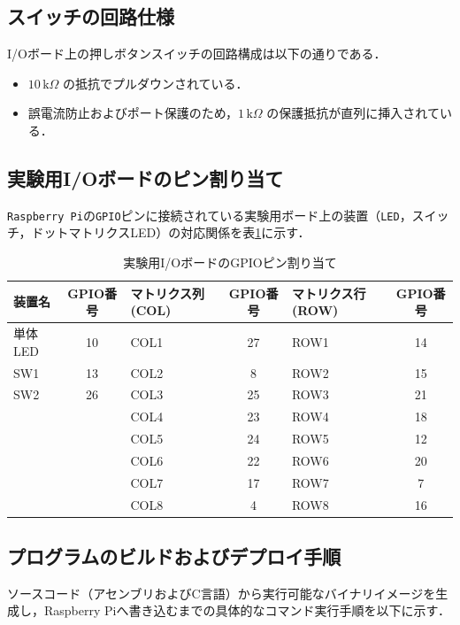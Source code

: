 \documentclass{jlreq}
\begin{document}
  \subsection{スイッチの回路仕様}
  I/Oボード上の押しボタンスイッチの回路構成は以下の通りである．
  \begin{itemize}
      \item $10\,\text{k}\Omega$ の抵抗でプルダウンされている．
      \item 誤電流防止およびポート保護のため，$1\,\text{k}\Omega$ の保護抵抗が直列に挿入されている．
  \end{itemize}

  \subsection{実験用I/Oボードのピン割り当て}
  \texttt{Raspberry Pi}の\texttt{GPIO}ピンに接続されている実験用ボード上の装置（\texttt{LED}，スイッチ，ドットマトリクスLED）の対応関係を表\ref{tab:pin_assign}に示す．

  \begin{table}[htbp]
      \centering
      \caption{実験用I/OボードのGPIOピン割り当て}
      \label{tab:pin_assign}
      \begin{tabular}{lc|lc|lc}
          \hline
          装置名 & GPIO番号 & マトリクス列(COL) & GPIO番号 & マトリクス行(ROW) & GPIO番号 \\ \hline
          単体LED & 10 & COL1 & 27 & ROW1 & 14 \\
          SW1     & 13 & COL2 & 8  & ROW2 & 15 \\
          SW2     & 26 & COL3 & 25 & ROW3 & 21 \\
                  &    & COL4 & 23 & ROW4 & 18 \\
                  &    & COL5 & 24 & ROW5 & 12 \\
                  &    & COL6 & 22 & ROW6 & 20 \\
                  &    & COL7 & 17 & ROW7 & 7  \\
                  &    & COL8 & 4  & ROW8 & 16 \\ \hline
      \end{tabular}
  \end{table}

  \subsection{プログラムのビルドおよびデプロイ手順}
  ソースコード（アセンブリおよびC言語）から実行可能なバイナリイメージを生成し，Raspberry Piへ書き込むまでの具体的なコマンド実行手順を以下に示す．
\end{document}
